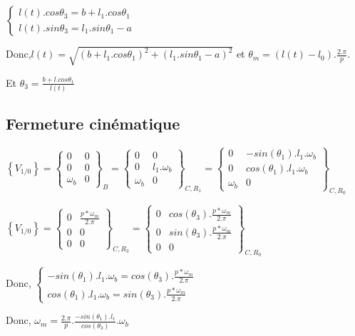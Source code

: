 $\left\{\begin{array}{l}
l(t).cos\theta_3=b+l_1.cos\theta_1 \\
l(t).sin\theta_3=l_1.sin\theta_1-a
\end{array}\right.$

Donc,$l(t)=\sqrt{(b+l_1.cos\theta_1)^2+(l_1.sin\theta_1-a)^2}$ et $\theta_m=(l(t)-l_0).\frac{2.\pi}{p}$.

Et $\theta_3=\frac{b+l.cos\theta_1}{l(t)}$

\subsection{Fermeture cinématique}

$\left\{V_{1/0}\right\}=
\left\{\begin{array}{cc}
0 & 0\\
0 & 0\\
\omega_b & 0
\end{array}
\right\}_B=
\left\{
\begin{array}{cc}
0 & 0\\
0 & l_1.\omega_b\\
\omega_b & 0
\end{array}
\right\}_{C,R_1}=
\left\{
\begin{array}{cc}
0 & -sin(\theta_1).l_1.\omega_b\\
0 & cos(\theta_1).l_1.\omega_b\\
\omega_b & 0
\end{array}
\right\}_{C,R_0}$

$\left\{V_{1/0}\right\}=
\left\{
\begin{array}{cc}
0 & \frac{p*\omega_m}{2.\pi}\\
0 & 0\\
0 & 0
\end{array}
\right\}_{C,R_3}=
\left\{
\begin{array}{cc}
0 & cos(\theta_3).\frac{p*\omega_m}{2.\pi}\\
0 & sin(\theta_3).\frac{p*\omega_m}{2.\pi}\\
0 & 0
\end{array}
\right\}_{C,R_0}$

Donc, 
$\left\{
\begin{array}{l}
-sin(\theta_1).l_1.\omega_b=cos(\theta_3).\frac{p*\omega_m}{2.\pi}\\
cos(\theta_1).l_1.\omega_b=sin(\theta_3).\frac{p*\omega_m}{2.\pi}
\end{array}\right.$

Donc, $\omega_m=\frac{2.\pi}{p}.\frac{-sin(\theta_1).l_1}{cos(\theta_3)}.\omega_b$

